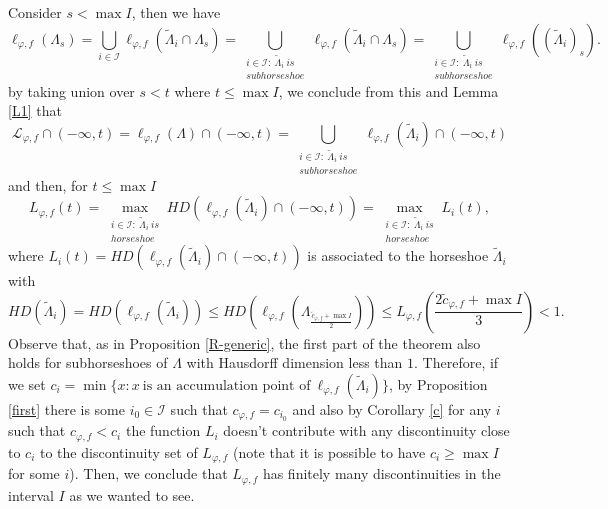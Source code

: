 \documentclass[12pt]{amsart}
\theoremstyle{plain} %
\theoremstyle{definition} %
\numberwithin{equation}{section}
\begin{document}
Consider $s<\max I$, then we have 
$$\ell_{\varphi,f}(\Lambda_s)=\bigcup \limits_{i\in \mathcal{I}} \ell_{\varphi,f}(\tilde{\Lambda}_i\cap\Lambda_s)=\bigcup \limits_{\substack{i\in \mathcal{I}: \ \tilde{\Lambda}_i \ is\\ subhorseshoe }} \ell_{\varphi,f}(\tilde{\Lambda}_i\cap\Lambda_s)=\bigcup \limits_{\substack{i\in \mathcal{I}: \ \tilde{\Lambda}_i \ is\\ subhorseshoe }} \ell_{\varphi,f}((\tilde{\Lambda}_i)_s). $$
by taking union over $s<t$ where $t\leq \max I$, we conclude from this and Lemma \ref{L1} that
$$\mathcal{L}_{\varphi,f}\cap (-\infty,t)=\ell_{\varphi,f}(\Lambda)\cap (-\infty,t)=\bigcup \limits_{\substack{i\in \mathcal{I}: \ \tilde{\Lambda}_i \ is\\ subhorseshoe }} \ell_{\varphi,f}(\tilde{\Lambda}_i)\cap (-\infty,t)$$
and then, for $t\leq \max I$
$$L_{\varphi, f}(t)=\max\limits_{\substack{i\in \mathcal{I}: \ \tilde{\Lambda}_i \ is\\ horseshoe }} HD(\ell_{\varphi,f}(\tilde{\Lambda}_i)\cap (-\infty,t))=\max\limits_{\substack{i\in \mathcal{I}: \ \tilde{\Lambda}_i \ is\\ horseshoe }} L_i(t),$$
where $L_i(t)=HD(\ell_{\varphi,f}(\tilde{\Lambda}_i)\cap (-\infty,t))$ is associated to the horseshoe $\tilde{\Lambda}_i$ with
$$HD(\tilde{\Lambda}_i)=HD(\ell_{\varphi,f}(\tilde{\Lambda}_i))\leq HD(\ell_{\varphi,f}(\Lambda_{\frac{\tilde{c}_{\varphi,f}+\max I}{2}}))\leq L_{\varphi, f}\left(\frac{2\tilde{c}_{\varphi,f}+\max I}{3}\right)<1.$$
Observe that, as in Proposition \ref{R-generic}, the first part of the theorem also holds for subhorseshoes of $\Lambda$ with Hausdorff dimension less than $1$. Therefore, if we set $c_i=\min \{x: x\ \textrm{is an accumulation point of}\ \ell_{\varphi,f}(\tilde{\Lambda}_i)\}$, by Proposition \ref{first} there is some $i_0\in \mathcal{I}$ such that $c_{\varphi,f}=c_{i_0}$ and also by Corollary \ref{c} for any $i$ such that $c_{\varphi,f}< c_i$ the function $L_i$ doesn't contribute with any discontinuity close to $c_i$ to the discontinuity set of $L_{\varphi,f}$ (note that it is possible to have $c_i\geq \max I$ for some $i$). Then, we conclude that $L_{\varphi, f}$ has finitely many discontinuities in the interval $I$ as we wanted to see.  
\end{document}
